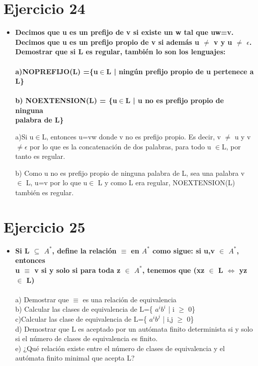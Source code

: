 \section{Ejercicio 24}
\begin{itemize}
	\item \textbf{Decimos que u es un prefijo de v si existe un w tal que uw=v. Decimos que u es un prefijo propio de v si además u $\not=$ v y u $\not =$ $\epsilon$. Demostrar que si L es regular, también lo son los lenguajes: \\ \\
	a)NOPREFIJO(L) =\{u$\in$L | ningún prefijo propio de u pertenece a L\} \\ \\
	b) NOEXTENSION(L) = \{u$\in$L | u no es prefijo propio de ninguna \\ palabra de L\}
	}
	
	a)Si u$\in$L, entonces u=vw donde v no es prefijo propio. Es decir, v $\not=$ u y v$\not=$$\epsilon$ por lo que es la concatenación de dos palabras, para todo u $\in$L, por tanto es regular.
	
	b) Como u no es prefijo propio de ninguna palabra de L, sea una palabra v $\in$ L, u=v por lo que u$\in$ L y como L era regular, NOEXTENSION(L) también es regular.
	
\end{itemize}

\newpage
\section{Ejercicio 25}
\begin{itemize}
	\item \textbf{Si L $\subseteq$ $A^{*}$, define la relación $\equiv$ en $A^{*}$ como sigue: si u,v $\in$ $A^{*}$, entonces \\u $\equiv$ v si y solo si para toda z $\in$ $A^{*}$, tenemos que (xz $\in$ L $\Longleftrightarrow$ yz $\in$ L)}\\
	\\a) Demostrar que $\equiv$ es una relación de equivalencia
	\\b) Calcular las clases de equivalencia de L=\{ $a^{i}b^{i}$ | i $\geq$ 0\}
	\\c)Calcular las clase de equivalencia de L=\{ $a^{i}b^{j}$ | i,j $\geq$ 0\}
	\\d) Demostrar que L es aceptado por un autómata finito determinista si y solo si el número de clases de equivalencia es finito.
	\\e) ¿Qué relación existe entre el número de clases de equivalencia y el autómata finito minimal que acepta L?
	
	
\end{itemize}

